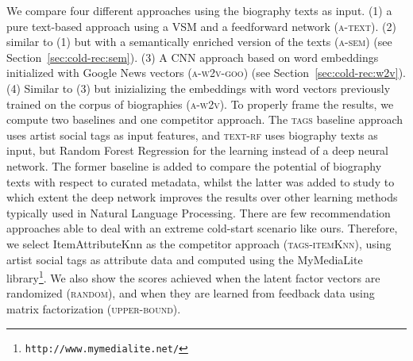 We compare four different approaches using the biography texts as input. (1) a pure text-based approach using a VSM and a feedforward network (\textsc{a-text}). (2) similar to (1) but with a semantically enriched version of the texts (\textsc{a-sem}) (see Section~\ref{sec:cold-rec:sem}). (3) A CNN approach based on word embeddings initialized with Google News vectors (\textsc{a-w2v-goo}) (see Section~\ref{sec:cold-rec:w2v}). (4) Similar to (3) but inizializing the embeddings with word vectors previously trained on the corpus of biographies (\textsc{a-w2v}). To properly frame the results, we compute two baselines and one competitor approach. The \textsc{tags} baseline approach uses artist social tags as input features, and \textsc{text-rf} uses biography texts as input, but Random Forest Regression for the learning instead of a deep neural network. The former baseline is added to compare the potential of biography texts with respect to curated metadata, whilst the latter was added to study to which extent the deep network improves the results over other learning methods typically used in Natural Language Processing. There are few recommendation approaches able to deal with an extreme cold-start scenario like ours. Therefore, we select ItemAttributeKnn \citep{GantnerDFRS10} as the competitor approach (\textsc{tags-itemKnn}), using artist social tags as attribute data and computed using the MyMediaLite library\footnote{\texttt{http://www.mymedialite.net/}}. %
We also show the scores achieved when the latent factor vectors are randomized (\textsc{random}), and when they are learned from feedback data using matrix factorization (\textsc{upper-bound}).

